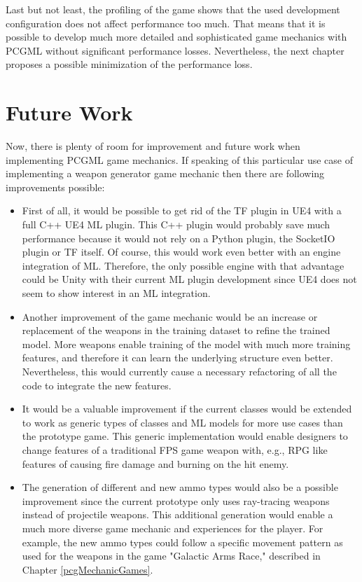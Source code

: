 \documentclass[MGS,Master,english]{twbook}%
\begin{document}
Last but not least, the profiling of the game shows that the used development configuration does not affect performance too much. That means that it is possible to develop much more detailed and sophisticated game mechanics with PCGML without significant performance losses. Nevertheless, the next chapter proposes a possible minimization of the performance loss.

\section{Future Work}
Now, there is plenty of room for improvement and future work when implementing PCGML game mechanics. If speaking of this particular use case of implementing a weapon generator game mechanic then there are following improvements possible:
\begin{itemize}
	\item First of all, it would be possible to get rid of the TF plugin in UE4 with a full C++ UE4 ML plugin. This C++ plugin would probably save much performance because it would not rely on a Python plugin, the SocketIO plugin or TF itself. Of course, this would work even better with an engine integration of ML. Therefore, the only possible engine with that advantage could be Unity with their current ML plugin development since UE4 does not seem to show interest in an ML integration. 
	\item Another improvement of the game mechanic would be an increase or replacement of the weapons in the training dataset to refine the trained model. More weapons enable training of the model with much more training features, and therefore it can learn the underlying structure even better. \\
	Nevertheless, this would currently cause a necessary refactoring of all the code to integrate the new features.
	\item It would be a valuable improvement if the current classes would be extended to work as generic types of classes and ML models for more use cases than the prototype game. This generic implementation would enable designers to change features of a traditional FPS game weapon with, e.g., RPG like features of causing fire damage and burning on the hit enemy.
	\item The generation of different and new ammo types would also be a possible improvement since the current prototype only uses ray-tracing weapons instead of projectile weapons. This additional generation would enable a much more diverse game mechanic and experiences for the player. For example, the new ammo types could follow a specific movement pattern as used for the weapons in the game "Galactic Arms Race," described in Chapter \ref{pcgMechanicGames}.

\end{itemize}
\end{document}
